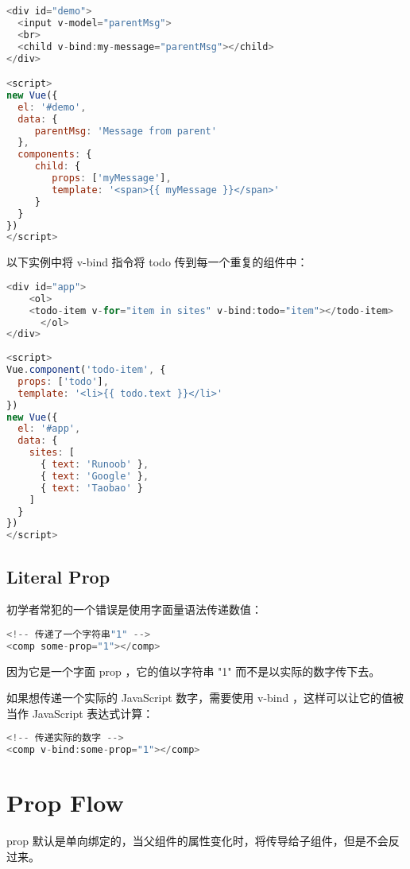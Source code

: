 \begin{lstlisting}[language=JavaScript]
<div id="demo">
  <input v-model="parentMsg">
  <br>
  <child v-bind:my-message="parentMsg"></child>
</div>

<script>
new Vue({
  el: '#demo',
  data: {
     parentMsg: 'Message from parent'
  },
  components: {
     child: {
        props: ['myMessage'],
        template: '<span>{{ myMessage }}</span>'
     }
  } 
})
</script>
\end{lstlisting}


以下实例中将 v-bind 指令将 todo 传到每一个重复的组件中：

\begin{lstlisting}[language=JavaScript]
<div id="app">
    <ol>
    <todo-item v-for="item in sites" v-bind:todo="item"></todo-item>
      </ol>
</div>
 
<script>
Vue.component('todo-item', {
  props: ['todo'],
  template: '<li>{{ todo.text }}</li>'
})
new Vue({
  el: '#app',
  data: {
    sites: [
      { text: 'Runoob' },
      { text: 'Google' },
      { text: 'Taobao' }
    ]
  }
})
</script>
\end{lstlisting}

\subsection{Literal Prop}


初学者常犯的一个错误是使用字面量语法传递数值：

\begin{lstlisting}[language=JavaScript]
<!-- 传递了一个字符串"1" -->
<comp some-prop="1"></comp>
\end{lstlisting}


因为它是一个字面 prop ，它的值以字符串 "1" 而不是以实际的数字传下去。


如果想传递一个实际的 JavaScript 数字，需要使用 v-bind ，这样可以让它的值被当作 JavaScript 表达式计算：



\begin{lstlisting}[language=JavaScript]
<!-- 传递实际的数字 -->
<comp v-bind:some-prop="1"></comp>
\end{lstlisting}


\section{Prop Flow}




prop 默认是单向绑定的，当父组件的属性变化时，将传导给子组件，但是不会反过来。

